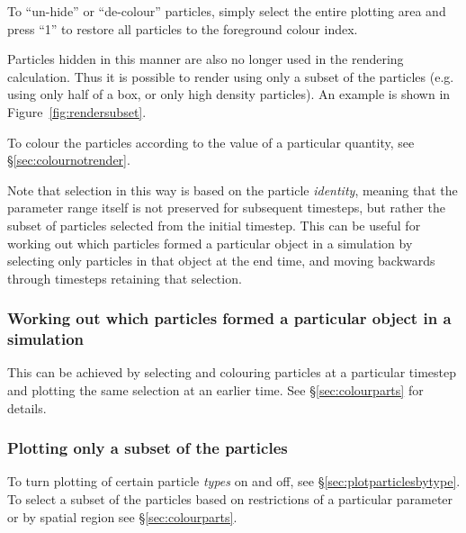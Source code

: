 \documentclass[a4paper,10pt]{article}
\begin{document}
 To ``un-hide'' or ``de-colour'' particles, simply select the entire plotting area and press ``1'' to restore all particles to the foreground colour index.
 
  Particles hidden in this manner are also no longer used in the rendering calculation. Thus it is possible to render using only a subset of the particles (e.g. using only half of a box, or only high density particles). An example is shown in Figure~\ref{fig:rendersubset}.

 To colour the particles according to the value of a particular quantity, see \S\ref{sec:colournotrender}.

 Note that selection in this way is based on the particle \emph{identity}, meaning that the parameter range itself is not preserved for subsequent timesteps, but rather the subset of particles selected from the initial timestep. This can be useful for working out which particles formed a particular object in a simulation by selecting only particles in that object at the end time, and moving backwards through timesteps retaining that selection.

\subsubsection{ Working out which particles formed a particular object in a simulation}
This can be achieved by selecting and colouring particles at a particular timestep and plotting the same selection at an earlier time. See \S\ref{sec:colourparts} for details.

\subsubsection{ Plotting only a subset of the particles}
 To turn plotting of certain particle \emph{types} on and off, see \S\ref{sec:plotparticlesbytype}. To select a subset of the particles based on restrictions of a particular parameter or by spatial region see \S\ref{sec:colourparts}.
\end{document}
